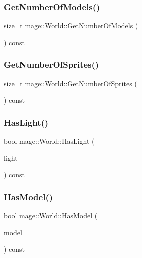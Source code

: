 \subsubsection{\texorpdfstring{Get\+Number\+Of\+Models()}{GetNumberOfModels()}}
{\footnotesize\ttfamily size\+\_\+t mage\+::\+World\+::\+Get\+Number\+Of\+Models (\begin{DoxyParamCaption}{ }\end{DoxyParamCaption}) const}

\hypertarget{classmage_1_1_world_a1223114c4cd4c231ed896682d37c6593}{}\label{classmage_1_1_world_a1223114c4cd4c231ed896682d37c6593} 
\subsubsection{\texorpdfstring{Get\+Number\+Of\+Sprites()}{GetNumberOfSprites()}}
{\footnotesize\ttfamily size\+\_\+t mage\+::\+World\+::\+Get\+Number\+Of\+Sprites (\begin{DoxyParamCaption}{ }\end{DoxyParamCaption}) const}

\hypertarget{classmage_1_1_world_acf4806658c635df685b4acc98febab2d}{}\label{classmage_1_1_world_acf4806658c635df685b4acc98febab2d} 
\subsubsection{\texorpdfstring{Has\+Light()}{HasLight()}}
{\footnotesize\ttfamily bool mage\+::\+World\+::\+Has\+Light (\begin{DoxyParamCaption}\item[{const \hyperlink{namespacemage_a1e01ae66713838a7a67d30e44c67703e}{Shared\+Ptr}$<$ \hyperlink{classmage_1_1_light}{Light} $>$}]{light }\end{DoxyParamCaption}) const}

\hypertarget{classmage_1_1_world_a821d420241b2a94502b20e24595490df}{}\label{classmage_1_1_world_a821d420241b2a94502b20e24595490df} 
\subsubsection{\texorpdfstring{Has\+Model()}{HasModel()}}
{\footnotesize\ttfamily bool mage\+::\+World\+::\+Has\+Model (\begin{DoxyParamCaption}\item[{const \hyperlink{namespacemage_a1e01ae66713838a7a67d30e44c67703e}{Shared\+Ptr}$<$ \hyperlink{classmage_1_1_model}{Model} $>$}]{model }\end{DoxyParamCaption}) const}

